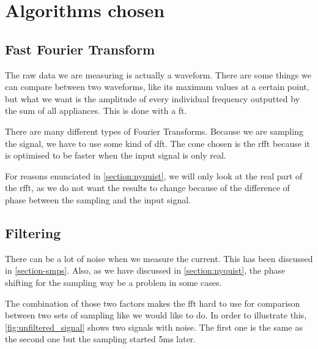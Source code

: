 \section{Algorithms chosen}
\subsection{Fast Fourier Transform}
The raw data we are measuring is actually a waveform. There are some things we can compare between two waveforms, like its maximum values at a certain point, but what we want is the amplitude of every individual frequency outputted by the sum of all appliances. This is done with a \acrshort{ft}.

There are many different types of Fourier Transforms. Because we are sampling the signal, we have to use some kind of \acrshort{dft}. The cone chosen is the \acrshort{rfft} because it is optimised to be faster when the input signal is only real.

For reasons enunciated in \autoref{section:nyquist}, we will only look at the real part of the \acrshort{rfft}, as we do not want the results to change because of the difference of phase between the sampling and the input signal.

\subsection{Filtering}
There can be a lot of noise when we measure the current. This has been discussed in \autoref{section-smps}. Also, as we have discussed in \autoref{section:nyquist}, the phase shifting for the sampling way be a problem in some cases.

The combination of those two factors makes the \acrshort{fft} hard to use for comparison between two sets of sampling like we would like to do. In order to illustrate this, \autoref{fig:unfiltered_signal} shows two signals with noise. The first one is the same as the second one but the sampling started 5ms later. 

